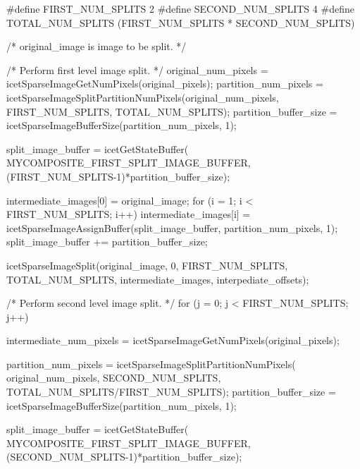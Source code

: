 \begin{code}
#define FIRST_NUM_SPLITS 2
#define SECOND_NUM_SPLITS 4
#define TOTAL_NUM_SPLITS (FIRST_NUM_SPLITS * SECOND_NUM_SPLITS)

/* original_image is image to be split. */

/* Perform first level image split. */
original_num_pixels = icetSparseImageGetNumPixels(original_pixels);
partition_num_pixels
    = icetSparseImageSplitPartitionNumPixels(original_num_pixels,
                                             FIRST_NUM_SPLITS,
                                             TOTAL_NUM_SPLITS);
partition_buffer_size = icetSparseImageBufferSize(partition_num_pixels, 1);

split_image_buffer = icetGetStateBuffer(
                                    MYCOMPOSITE_FIRST_SPLIT_IMAGE_BUFFER,
                                    (FIRST_NUM_SPLITS-1)*partition_buffer_size);

intermediate_images[0] = original_image;
for (i = 1; i < FIRST_NUM_SPLITS; i++) {
    intermediate_images[i] = icetSparseImageAssignBuffer(split_image_buffer,
                                                         partition_num_pixels,
                                                         1);
    split_image_buffer += partition_buffer_size;
}

icetSparseImageSplit(original_image,
                     0,
                     FIRST_NUM_SPLITS,
                     TOTAL_NUM_SPLITS,
                     intermediate_images,
                     interpediate_offsets);

/* Perform second level image split. */
for (j = 0; j < FIRST_NUM_SPLITS; j++) {
    intermediate_num_pixels = icetSparseImageGetNumPixels(original_pixels);

    partition_num_pixels = icetSparseImageSplitPartitionNumPixels(
                                             original_num_pixels,
                                             SECOND_NUM_SPLITS,
                                             TOTAL_NUM_SPLITS/FIRST_NUM_SPLITS);
    partition_buffer_size = icetSparseImageBufferSize(partition_num_pixels, 1);

    split_image_buffer = icetGetStateBuffer(
                                   MYCOMPOSITE_FIRST_SPLIT_IMAGE_BUFFER,
                                   (SECOND_NUM_SPLITS-1)*partition_buffer_size);

}
\end{code}
